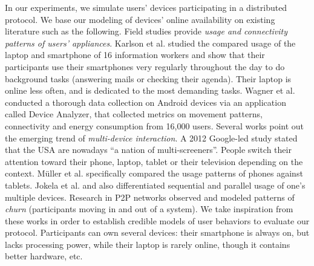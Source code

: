 In our experiments, we simulate users' devices participating in a distributed protocol. We base our modeling of devices' online availability on existing literature such as the following.  
Field studies provide \emph{usage and connectivity patterns of users' appliances}. Karlson et al. \cite{Karlson_Meyers_Jacobs_Johns_Kane_2009} studied the compared usage of the laptop and smartphone of 16 information workers and show that their participants use their smartphones very regularly throughout the day to do background tasks (\eg answering mails or checking their agenda). Their laptop is online less often, and is dedicated to the most demanding tasks. Wagner et al. \cite{Wagner_Rice_Beresford_2013} conducted a thorough data collection on Android devices via an application called Device Analyzer, that collected metrics on movement patterns, connectivity and energy consumption from 16,000 users.
Several works point out the emerging trend of \emph{multi-device interaction}.
A 2012 Google-led study \cite{google2012} stated that the USA are nowadays ``a nation of multi-screeners''. People switch their attention toward their phone, laptop, tablet or their television depending on the context.
M\"uller et al. \cite{Muller_Gove_Webb_Cheang_2015} specifically compared the usage patterns of phones against tablets.
Jokela et al. \cite{Jokela_Ojala_Olsson_2015} and \cite{google2012} also differentiated sequential and parallel usage of one's multiple devices.
Research in P2P networks observed \cite{Stutzbach_Rejaie_2006} and modeled \cite{Yao_Leonard_Wang_Loguinov_2006} patterns of \emph{churn} (\ie participants moving in and out of a system).
We take inspiration from these works in order to establish credible models of user behaviors to evaluate our protocol. 
Participants can own several devices: their smartphone is always on, but lacks processing power, while their laptop is rarely online, though it contains better hardware, etc. 


